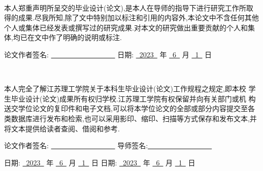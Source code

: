 \begin{center}


~\\
\end{center}

本人郑重声明所呈交的毕业设计(论文),是本人在导师的指导下进行研究工作所取得的成果.尽我所知,除了文中特别加以标注和引用的内容外,本论文中不含任何其他个人或集体已经发表或撰写过的研究成果.对本文的研究做出重要贡献的个人和集体,均已在文中作了明确的说明或标注.

\vspace{40pt}
论文作者签名: \underline{~~~~~~~~~~~~~~~~~~}
\text{~~~~~~~~~~~~~~~~~~~~~}
日期: \underline{~2023~}  年
\underline{~6~}  月
\underline{~1~} 日


\vspace{80pt}

\begin{center}
	
~\\
\end{center}


本人完全了解江苏理工学院关于本科生毕业设计(论文)工作规程之规定,即本校 学生毕业设计(论文)成果所有权归学校.江苏理工学院有权保留并向有关部门或机 构送交学位论文的复印件和电子文档,可以将本学位论文的全部或部分内容提交至各 类数据库进行发布和检索,也可以采用影印、缩印、扫描等方式保存和发布文本,并 将文本提供给读者查阅、借阅和参考.
\vspace{40pt}


论文作者签名: \underline{~~~~~~~~~~~~~~~~~~}
\text{~~~~~~~~~~~~~~~~~~~~~}
导师签名:\underline{~~~~~~~~~~~~~~~~~~}


日期: \underline{~2023~}  年
\underline{~6~}  月
\underline{~1~} 日
\text{~~~~~~~~~~~~~~~~~~~~~~}
日期: \underline{~2023~}  年
\underline{~6~}  月
\underline{~1~} 日